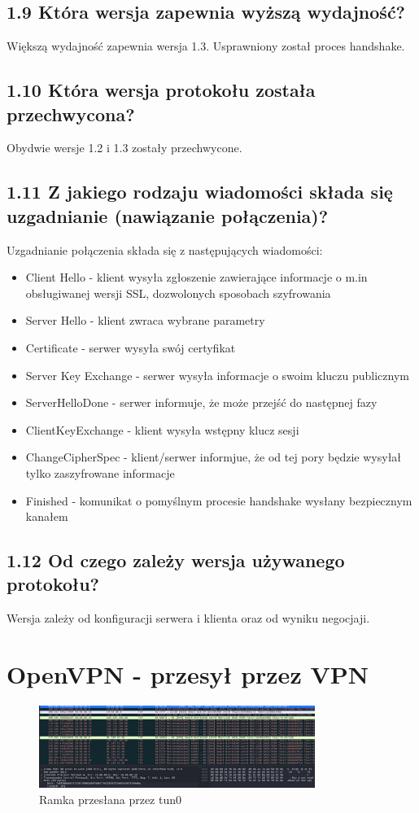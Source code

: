 \documentclass{article}
\begin{document}
\subsection*{1.9 Która wersja zapewnia wyższą wydajność?}
Większą wydajność zapewnia wersja 1.3. Usprawniony został proces handshake.
\subsection*{1.10 Która wersja protokołu została przechwycona?}
Obydwie wersje 1.2 i 1.3 zostały przechwycone.
\subsection*{1.11 Z jakiego rodzaju wiadomości składa się uzgadnianie (nawiązanie
  połączenia)?}
Uzgadnianie połączenia składa się z następujących wiadomości:
\begin{itemize}
  \item Client Hello - klient wysyła zgłoszenie zawierające informacje o m.in obsługiwanej wersji SSL, dozwolonych sposobach szyfrowania
  \item Server Hello - klient zwraca wybrane parametry
  \item Certificate - serwer wysyła swój certyfikat
  \item Server Key Exchange - serwer wysyła informacje o swoim kluczu publicznym
  \item ServerHelloDone - serwer informuje, że może przejść do następnej fazy
  \item ClientKeyExchange - klient wysyła wstępny klucz sesji
  \item ChangeCipherSpec - klient/serwer informjue, że od tej pory będzie wysyłał tylko zaszyfrowane informacje
  \item Finished - komunikat o pomyślnym procesie handshake wysłany bezpiecznym kanałem
\end{itemize}
\subsection*{1.12 Od czego zależy wersja używanego protokołu?}
Wersja zależy od konfiguracji serwera i klienta oraz od wyniku negocjaji.

\section{OpenVPN - przesył przez VPN}

\begin{figure}[H]
  \centering
  \includegraphics[width=0.8\textwidth]{8_netcat_tun0.png}
  \caption{Ramka przesłana przez tun0}
\end{figure}
\end{document}
